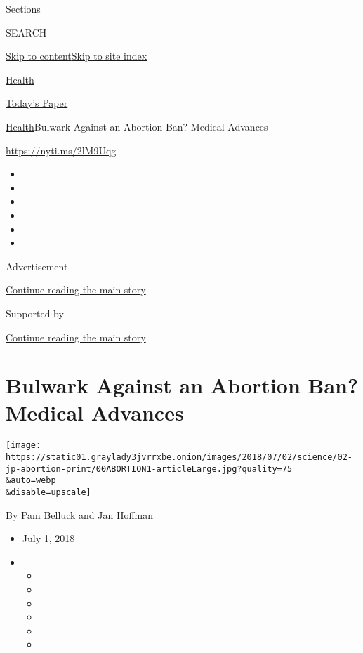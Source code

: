 Sections

SEARCH

\protect\hyperlink{site-content}{Skip to
content}\protect\hyperlink{site-index}{Skip to site index}

\href{https://www.nytimes3xbfgragh.onion/section/health}{Health}

\href{https://myaccount.nytimes3xbfgragh.onion/auth/login?response_type=cookie\&client_id=vi}{}

\href{https://www.nytimes3xbfgragh.onion/section/todayspaper}{Today's
Paper}

\href{/section/health}{Health}\textbar{}Bulwark Against an Abortion Ban?
Medical Advances

\url{https://nyti.ms/2lM9Uqg}

\begin{itemize}
\item
\item
\item
\item
\item
\item
\end{itemize}

Advertisement

\protect\hyperlink{after-top}{Continue reading the main story}

Supported by

\protect\hyperlink{after-sponsor}{Continue reading the main story}

\hypertarget{bulwark-against-an-abortion-ban-medical-advances}{%
\section{Bulwark Against an Abortion Ban? Medical
Advances}\label{bulwark-against-an-abortion-ban-medical-advances}}

\texttt{[image: https://static01.graylady3jvrrxbe.onion/images/2018/07/02/science/02-jp-abortion-print/00ABORTION1-articleLarge.jpg?quality=75\\\&auto=webp\\\&disable=upscale]}

By \href{http://www.nytimes3xbfgragh.onion/by/pam-belluck}{Pam Belluck}
and \href{http://www.nytimes3xbfgragh.onion/by/jan-hoffman}{Jan Hoffman}

\begin{itemize}
\item
  July 1, 2018
\item
  \begin{itemize}
  \item
  \item
  \item
  \item
  \item
  \item
  \end{itemize}
\end{itemize}

